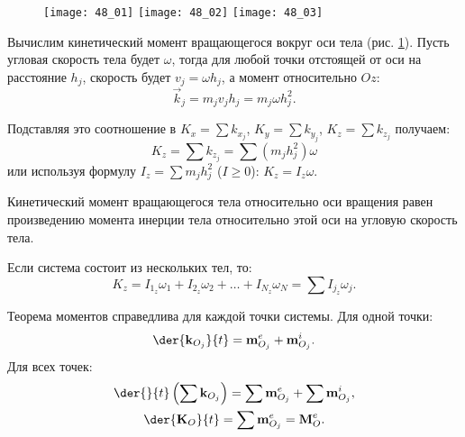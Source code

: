 \begin{figure}[h!]
    \texttt{[image: 48\_01]}
    \texttt{[image: 48\_02]}
    \texttt{[image: 48\_03]} \\
    \parbox{.32\textwidth}{\caption{} \label{pic48_1}}
    \parbox{.32\textwidth}{\caption{} \label{pic48_2}}
    \parbox{.32\textwidth}{\caption{} \label{pic48_3}}
\end{figure}

Вычислим кинетический момент вращающегося вокруг оси тела (рис. \ref{pic48_3}). Пусть угловая
скорость тела будет \( \omega \), тогда для любой точки отстоящей от оси на
расстояние \( h_j \), скорость будет \( v_j = \omega h_j \), а момент
относительно \( Oz \):
\[
    \vec{k}_j = m_j v_j h_j = m_j\omega h_j^2.
\]

Подставляя это соотношение в \( K_x = \sum k_{x_j} \),
\( K_y = \sum k_{y_j} \), \( K_z = \sum k_{z_j} \) получаем:
\[
    K_z = \sum k_{z_j} = \sum (m_j h_j^2)\omega
\] 
или используя формулу \( I_z = \sum m_j h_j^2 \) (\( I \ge 0 \)):
\( K_z = I_z\omega \).
 
Кинетический момент вращающегося тела относительно оси вращения равен
произведению момента инерции тела относительно этой оси на угловую скорость
тела.

Если система состоит из нескольких тел, то:
\[
    K_z = I_{1_z}\omega_1 + I_{2_z}\omega_2 + \ldots + I_{N_z}\omega_N =
    \sum I_{j_z}\omega_j.
\]
 
Теорема моментов справедлива для каждой точки системы. Для одной точки:
\[
    \der{\vec{k}_{O_j}}{t} = \vec{m}^e_{O_j} +
    \vec{m}^i_{O_j}.
\]
Для всех точек:
\begin{gather*}
    \der{}{t}\left(\sum\vec{k}_{O_j}\right) =
    \sum\vec{m}^e_{O_j} + \sum\vec{m}^i_{O_j}, \\
    \der{\vec{K}_O}{t} = \sum\vec{m}^e_{O_j} = \vec{M}^e_O.
\end{gather*}

\newpage
